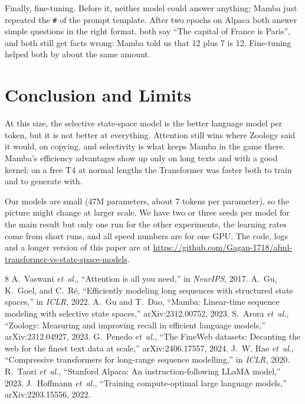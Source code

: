\documentclass[conference]{IEEEtran}
\begin{document}
Finally, fine-tuning. Before it, neither model could answer anything; Mamba just repeated the \texttt{\#} of
the prompt template. After two epochs on Alpaca both answer simple questions in the right format, both say
``The capital of France is Paris'', and both still get facts wrong: Mamba told us that 12 plus 7 is 12.
Fine-tuning helped both by about the same amount.

\section{Conclusion and Limits}
At this size, the selective state-space model is the better language model per token, but it is not better
at everything. Attention still wins where Zoology said it would, on copying, and selectivity is what keeps
Mamba in the game there. Mamba's efficiency advantages show up only on long texts and with a good kernel;
on a free T4 at normal lengths the Transformer was faster both to train and to generate with.

Our models are small (47M parameters, about 7 tokens per parameter), so the picture might change at larger
scale. We have two or three seeds per model for the main result but only one run for the other
experiments, the learning rates come from short runs, and all speed numbers are for one GPU. The code, logs
and a longer version of this paper are at
\url{https://github.com/Gagan-1718/afml-transformer-vs-state-space-models}.

\begin{thebibliography}{8}
 A.~Vaswani \emph{et~al.}, ``Attention is all you need,'' in \emph{NeurIPS},
2017.
 A.~Gu, K.~Goel, and C.~R{\'e}, ``Efficiently modeling long sequences with structured state
spaces,'' in \emph{ICLR}, 2022.
 A.~Gu and T.~Dao, ``Mamba: Linear-time sequence modeling with selective state spaces,''
arXiv:2312.00752, 2023.
 S.~Arora \emph{et~al.}, ``Zoology: Measuring and improving recall in efficient
language models,'' arXiv:2312.04927, 2023.
 G.~Penedo \emph{et~al.}, ``The FineWeb datasets: Decanting the web for the finest
text data at scale,'' arXiv:2406.17557, 2024.
 J.~W. Rae \emph{et~al.}, ``Compressive transformers for long-range sequence
modelling,'' in \emph{ICLR}, 2020.
 R.~Taori \emph{et~al.}, ``Stanford Alpaca: An instruction-following LLaMA model,''
2023.
 J.~Hoffmann \emph{et~al.}, ``Training compute-optimal large language
models,'' arXiv:2203.15556, 2022.
\end{thebibliography}
\end{document}
